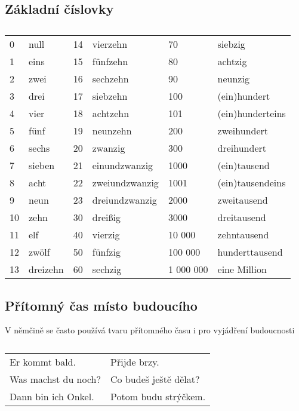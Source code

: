     \subsection*{Základní číslovky}
      \begin{table}[ht!]   %
        \centering
        \begin{tabular}{llllll}
          \hline
            0  & null     & 14 & vierzehn       & 70        & siebzig          \\
            1  & eins     & 15 & fünfzehn       & 80        & achtzig          \\
            2  & zwei     & 16 & sechzehn       & 90        & neunzig          \\
            3  & drei     & 17 & siebzehn       & 100       & (ein)hundert     \\
            4  & vier     & 18 & achtzehn       & 101       & (ein)hunderteins \\
            5  & fünf     & 19 & neunzehn       & 200       & zweihundert      \\ 
            6  & sechs    & 20 & zwanzig        & 300       & dreihundert      \\
            7  & sieben   & 21 & einundzwanzig  & 1000      & (ein)tausend     \\ 
            8  & acht     & 22 & zweiundzwanzig & 1001      & (ein)tausendeins \\
            9  & neun     & 23 & dreiundzwanzig & 2000      & zweitausend      \\
            10 & zehn     & 30 & dreißig        & 3000      & dreitausend      \\
            11 & elf      & 40 & vierzig        & 10 000    & zehntausend      \\
            12 & zwölf    & 50 & fünfzig        & 100 000   & hunderttausend   \\
            13 & dreizehn & 60 & sechzig        & 1 000 000 & eine Million     \\
          \hline
        \end{tabular}
        \caption*{ }
      \end{table}

    \subsection*{Přítomný čas místo budoucího}
      V němčině se často používá tvaru přítomného času i pro vyjádření budoucnosti
      \begin{table}[ht!]   %
        \centering
        \begin{tabular}{ll} 
          Er kommt bald.      & Přijde brzy.           \\
          Was machst du noch? & Co budeš ještě dělat?  \\
          Dann bin ich Onkel. & Potom budu strýčkem.   \\
        \end{tabular}
        \caption*{ }
      \end{table}
      
